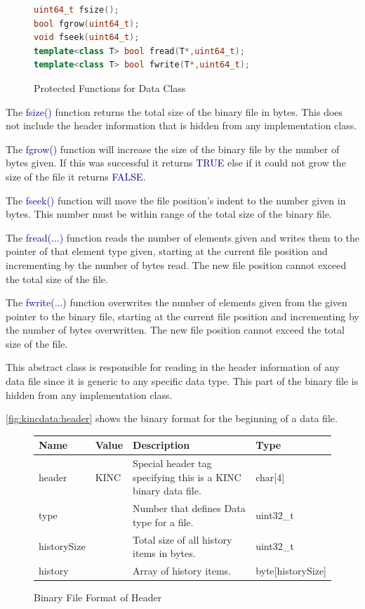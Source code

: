 \documentclass[10pt]{article}
\providecommand{\h}[1]{\textcolor{darkblue}{#1}}
\begin{document}
\begin{figure}[H]
\begin{mdframed}[style=functions]
\begin{lstlisting}[language=C++]
uint64_t fsize();
bool fgrow(uint64_t);
void fseek(uint64_t);
template<class T> bool fread(T*,uint64_t);
template<class T> bool fwrite(T*,uint64_t);
\end{lstlisting}
\end{mdframed}
\caption{Protected Functions for Data Class}
\label{fig:data:func:prot}
\end{figure}

The \h{fsize()} function returns the total size of the binary file in bytes. 
This does not include the header information that is hidden from any 
implementation class.

The \h{fgrow()} function will increase the size of the binary file by the 
number of bytes given. If this was successful it returns \h{TRUE} else if it 
could not grow the size of the file it returns \h{FALSE}.

The \h{fseek()} function will move the file position's indent to the number 
given in bytes. This number must be within range of the total size of the 
binary file.

The \h{fread(...)} function reads the number of elements given and writes them 
to the pointer of that element type given, starting at the current file 
position and incrementing by the number of bytes read. The new file position 
cannot exceed the total size of the file.

The \h{fwrite(...)} function overwrites the number of elements given from the 
given pointer to the binary file, starting at the current file position and 
incrementing by the number of bytes overwritten. The new file position cannot 
exceed the total size of the file.

This abstract class is responsible for reading in the header information of any 
data file since it is generic to any specific data type. This part of the 
binary file is hidden from any implementation class.

\autoref{fig:kincdata:header} shows the binary format for the beginning 
of a data file.

\begin{figure}[H]
\begin{mdframed}[style=btable]
\begin{tabularx}{\textwidth}{|l|l|X|l|}
\hline
\textbf{Name} & \textbf{Value} & \textbf{Description} & \textbf{Type} \\
\hline
header & KINC & Special header tag specifying this is a KINC binary data file. 
& char[4] \\
\hline
type & & Number that defines Data type for a file. & uint32\_t \\
\hline
historySize & & Total size of all history items in bytes. & uint32\_t \\
\hline
history & & Array of history items. & byte[historySize] \\
\hline
\end{tabularx}
\end{mdframed}
\caption{Binary File Format of Header}
\label{fig:kincdata:header}
\end{figure}
\end{document}
